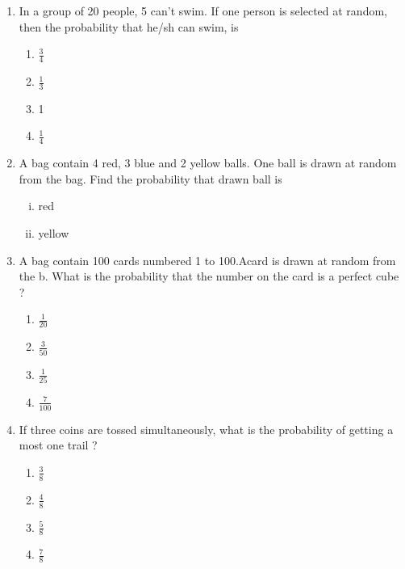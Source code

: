 \documentclass{article}
\newcommand{\one}{1}
\begin{document}
\begin{enumerate}[\one.1]
\begin{enumerate}
                        \end{enumerate}
        \item In a group of 20 people, 5 can't swim. If one person is selected at random, then the probability that he/sh can swim, is
                        \begin{enumerate}
                                \item $ \frac {3} {4} $
                                \item $ \frac {1} {3} $
                                \item 1
                                \item $ \frac {1} {4} $
                        \end{enumerate}
        \item A bag contain 4 red, 3 blue and 2 yellow balls. One ball is drawn at random from the bag. Find the probability that drawn ball is
                \begin{enumerate}[(i)]
                                        \item red
                                        \item yellow
                \end{enumerate}
        \item A bag contain 100 cards numbered 1 to 100.Acard is drawn at random from the b. What is the probability that the number on the card is a perfect cube ?
                        \begin{enumerate}
                                \item $ \frac {1} {20} $
                                \item $ \frac {3} {50} $
                                \item $ \frac {1} {25} $
                                \item $ \frac {7} {100} $
                        \end{enumerate}
        \item If three coins are tossed simultaneously, what is the probability of getting a most one trail ?
                        \begin{enumerate}
                                \item $ \frac {3} {8} $
                                \item $ \frac {4} {8} $
                                \item $ \frac {5} {8} $
                                \item $ \frac {7} {8} $

\end{enumerate}
\end{enumerate}
\end{document}
